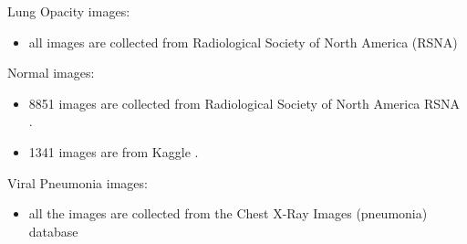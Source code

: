 \documentclass{article}
\begin{document}
Lung Opacity images:
\begin{itemize}
    \item all images are collected from Radiological Society of North America (RSNA) \cite{url_8}
\end{itemize}

Normal images:
\begin{itemize}
    \item 8851 images are collected from Radiological Society of North America RSNA \cite{url_8}.
    \item 1341 images are from Kaggle \cite{url_9}.
\end{itemize}

Viral Pneumonia images:
\begin{itemize}
    \item all the images are collected from  the Chest X-Ray Images (pneumonia) database \cite{url_9}
\end{itemize}
\end{document}
